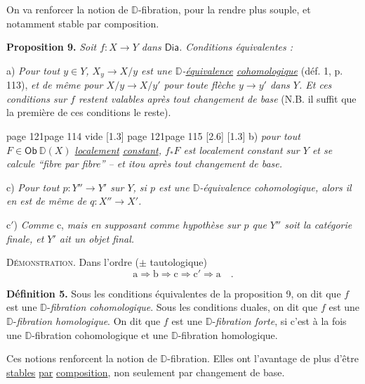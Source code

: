 \documentclass[11pt,leqno]{article}
\newcommand{\printedpage}[1]{\marginnote{\scriptsize\sffamily ed.\ #1}}
\newcommand{\msp}[1]{%
  \begingroup\def\thismsp{#1}\def\blankmsp{page 114 vide}%
  \ifx\thismsp\blankmsp
    \marginnote{\scriptsize\sffamily [114: vide]}[1.3\baselineskip]%
  \else\def\followingmsp{page 115}%
    \ifx\thismsp\followingmsp
      \marginnote{\scriptsize\sffamily [page 115]}[2.6\baselineskip]%
    \else\marginnote{\scriptsize\sffamily [#1]}[1.3\baselineskip]\fi
  \fi\endgroup}
\newcommand{\Dia}{\ensuremath{\mathsf{Dia}}}
\newcommand{\Ob}{\ensuremath{\mathsf{Ob}}}
\newcommand{\D}{\ensuremath{\mathbb{D}}}
\begin{document}
\printedpage{72}

On va renforcer la notion de $\D$-fibration, pour la rendre plus souple, et notamment stable par composition.

\textbf{Proposition 9.} \textit{Soit $f : X \to Y$ dans \Dia. Conditions équivalentes :}

a) \textit{Pour tout $y \in Y$, $X_y \to X/y$ est une $\D$-\underline{équivalence} \underline{cohomologique}} (déf. 1, p. 113), \textit{et de même pour $X/y \to X/y'$ pour toute flèche $y \to y'$ dans $Y$. Et ces conditions sur $f$ restent valables après tout changement de base} (N.B. il suffit que la première de ces conditions le reste).

\msp{page 121}b) \textit{pour tout $F \in \Ob\ \D(X)$ \underline{localement} \underline{constant}, $f_*F$ est localement constant sur $Y$ et se calcule “fibre par fibre” -- et itou après tout changement de base.} %

c) \textit{Pour tout $p : Y'' \to Y'$ sur $Y$, si $p$ est une $\D$-équivalence cohomologique, alors il en est de même de $q : X'' \to X'$.}

c$'$) \textit{Comme} c, \textit{mais en supposant comme hypothèse sur $p$ que $Y''$ soit la catégorie finale, et $Y'$ ait un objet final.}

\textsc{Démonstration}. Dans l'ordre ($\pm$ tautologique)
\[
\mathrm{a} \Longrightarrow \mathrm{b} \Longrightarrow \mathrm{c} \Longrightarrow \mathrm{c}' \Longrightarrow \mathrm{a} \quad .
\]

\textbf{Définition 5.} Sous les conditions équivalentes de la proposition 9, on dit que $f$ est une $\D$-\textit{fibration cohomologique}. Sous les conditions duales, on dit que $f$ est une $\D$-\textit{fibration homologique}. On dit que $f$ est une $\D$-\textit{fibration forte}, si c'est à la fois une $\D$-fibration cohomologique et une $\D$-fibration homologique.

Ces notions renforcent la notion de $\D$-fibration. Elles ont l'avantage de plus d'être \underline{stables} \underline{par} \underline{composition}, non seulement par changement de base.
\end{document}
